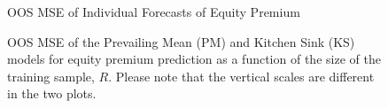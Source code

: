 \documentclass[11pt]{article}
\begin{document}
\begin{figure}
\centering
\large{OOS MSE of Individual Forecasts of Equity Premium}


\caption{OOS MSE of the Prevailing Mean (PM) and
    Kitchen Sink (KS) models for equity premium prediction as
    a function of the size of the training sample, $R$.  Please note
    that the vertical scales are different in the two plots.}
\label{fig:empirics3}
\end{figure}
\end{document}
